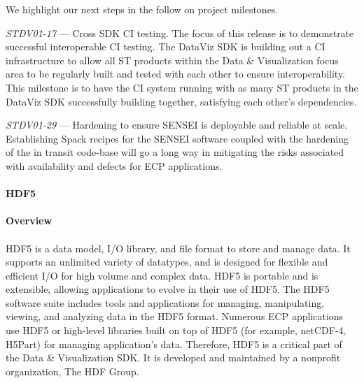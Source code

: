 We highlight our next steps in the follow on project milestones.

\textit{STDV01-17} --- Cross SDK CI testing. The focus of this release is to demonstrate successful interoperable CI testing. The DataViz SDK is building out a CI infrastructure to allow all ST products within the Data \& Visualization focus area to be regularly built and tested with each other to ensure interoperability. This milestone is to have the CI system running with as many ST products in the DataViz SDK successfully building together, satisfying each other's dependencies.

\textit{STDV01-29} --- Hardening to ensure SENSEI is deployable and reliable at scale. Establishing Spack recipes for the SENSEI software coupled with the hardening of the in transit code-base will go a long way in mitigating the risks associated with availability and defects for ECP applications. 

\paragraph{HDF5}
\paragraph{Overview}
\paragraph{}
HDF5 is a data model, I/O library, and file format to store and manage data. It supports an unlimited variety of datatypes, and is designed for flexible and efficient I/O for high volume and complex data. HDF5 is portable and is extensible, allowing applications to evolve in their use of HDF5. The HDF5 software suite includes tools and applications for managing, manipulating, viewing, and analyzing data in the HDF5 format. Numerous ECP applications use HDF5 or high-level libraries built on top of HDF5 (for example, netCDF-4, H5Part) for managing application's data. Therefore, HDF5 is a critical part of the Data & Visualization SDK. It is developed and maintained by a nonprofit organization, The HDF Group.

